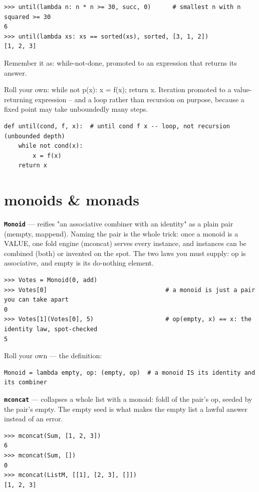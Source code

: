 \documentclass[10pt,letterpaper]{article}
\begin{document}
\begin{lstlisting}[style=ex]
>>> until(lambda n: n * n >= 30, succ, 0)      # smallest n with n squared >= 30
6
>>> until(lambda xs: xs == sorted(xs), sorted, [3, 1, 2])
[1, 2, 3]
\end{lstlisting}

Remember it as: while-not-done, promoted to an expression that returns its answer.


Roll your own: while not p(x): x = f(x); return x. Iteration promoted to a value-returning expression -- and a loop rather than recursion on purpose, because a fixed point may take unboundedly many steps.

\begin{lstlisting}[style=ex]
def until(cond, f, x):  # until cond f x -- loop, not recursion (unbounded depth)
    while not cond(x):
        x = f(x)
    return x
\end{lstlisting}

\section{monoids \& monads}
\textbf{\texttt{Monoid}} --- reifies "an associative combiner with an identity" as a plain pair (mempty, mappend). Naming the pair is the whole trick: once a monoid is a VALUE, one fold engine (mconcat) serves every instance, and instances can be combined (both) or invented on the spot. The two laws you must supply: op is associative, and empty is its do-nothing element.
\begin{lstlisting}[style=ex]
>>> Votes = Monoid(0, add)
>>> Votes[0]                                 # a monoid is just a pair you can take apart
0
>>> Votes[1](Votes[0], 5)                    # op(empty, x) == x: the identity law, spot-checked
5
\end{lstlisting}

Roll your own --- the definition:

\begin{lstlisting}[style=ex]
Monoid = lambda empty, op: (empty, op)  # a monoid IS its identity and its combiner
\end{lstlisting}
\textbf{\texttt{mconcat}} --- collapses a whole list with a monoid: foldl of the pair's op, seeded by the pair's empty. The empty seed is what makes the empty list a lawful answer instead of an error.
\begin{lstlisting}[style=ex]
>>> mconcat(Sum, [1, 2, 3])
6
>>> mconcat(Sum, [])
0
>>> mconcat(ListM, [[1], [2, 3], []])
[1, 2, 3]
\end{lstlisting}
\end{document}

